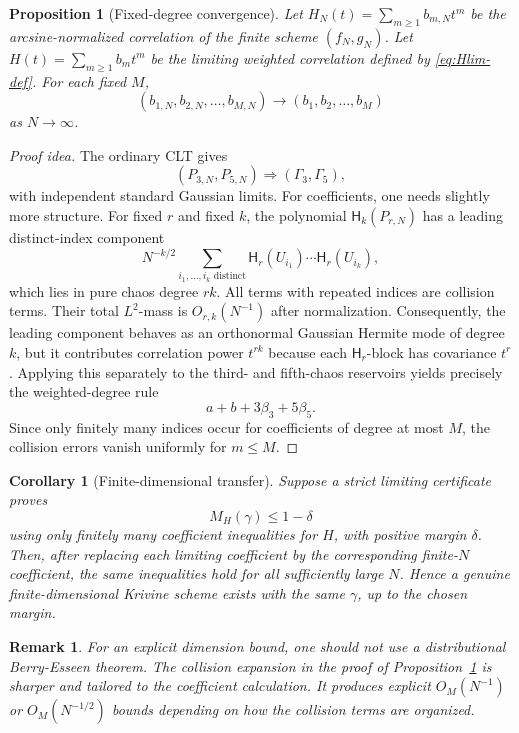 \documentclass[11pt]{article}
\newtheorem{proposition}[theorem]{Proposition}
\newtheorem{corollary}[theorem]{Corollary}
\newtheorem{remark}[theorem]{Remark}
\newcommand{\1}{\mathbf{1}}
\newcommand{\Herm}{\mathsf H}
\begin{document}
\begin{proposition}[Fixed-degree convergence]\label{prop:fixed-degree-convergence}
Let \(H_N(t)=\sum_{m\ge1}b_{m,N}t^m\) be the arcsine-normalized correlation of the finite scheme \((f_N,g_N)\).  Let \(H(t)=\sum_{m\ge1}b_mt^m\) be the limiting weighted correlation defined by \eqref{eq:Hlim-def}.  For each fixed \(M\),
\[
        (b_{1,N},b_{2,N},\ldots,b_{M,N})\longrightarrow
        (b_1,b_2,
        \ldots,b_M)
\]
as \(N\to\infty\).
\end{proposition}

\begin{proof}[Proof idea]
The ordinary CLT gives
\[
        (P_{3,N},P_{5,N})\Rightarrow (\Gamma_3,\Gamma_5),
\]
with independent standard Gaussian limits.  For coefficients, one needs slightly more structure.  For fixed \(r\) and fixed \(k\), the polynomial \(\Herm_k(P_{r,N})\) has a leading distinct-index component
\[
        N^{-k/2}\sum_{i_1,\ldots,i_k\text{ distinct}}
        \Herm_r(U_{i_1})\cdots\Herm_r(U_{i_k}),
\]
which lies in pure chaos degree \(rk\).  All terms with repeated indices are collision terms.  Their total \(L^2\)-mass is \(O_{r,k}(N^{-1})\) after normalization.  Consequently, the leading component behaves as an orthonormal Gaussian Hermite mode of degree \(k\), but it contributes correlation power \(t^{rk}\) because each \(\Herm_r\)-block has covariance \(t^r\).  Applying this separately to the third- and fifth-chaos reservoirs yields precisely the weighted-degree rule
\[
        a+b+3\beta_3+5\beta_5.
\]
Since only finitely many indices occur for coefficients of degree at most \(M\), the collision errors vanish uniformly for \(m\le M\).
\end{proof}

\begin{corollary}[Finite-dimensional transfer]\label{cor:finite-transfer}
Suppose a strict limiting certificate proves
\[
        M_H(\gamma)\le 1-\delta
\]
using only finitely many coefficient inequalities for \(H\), with positive margin \(\delta\).  Then, after replacing each limiting coefficient by the corresponding finite-\(N\) coefficient, the same inequalities hold for all sufficiently large \(N\).  Hence a genuine finite-dimensional Krivine scheme exists with the same \(\gamma\), up to the chosen margin.
\end{corollary}

\begin{remark}
For an explicit dimension bound, one should not use a distributional Berry-Esseen theorem.  The collision expansion in the proof of Proposition~\ref{prop:fixed-degree-convergence} is sharper and tailored to the coefficient calculation.  It produces explicit \(O_{M}(N^{-1})\) or \(O_M(N^{-1/2})\) bounds depending on how the collision terms are organized.
\end{remark}
\end{document}
